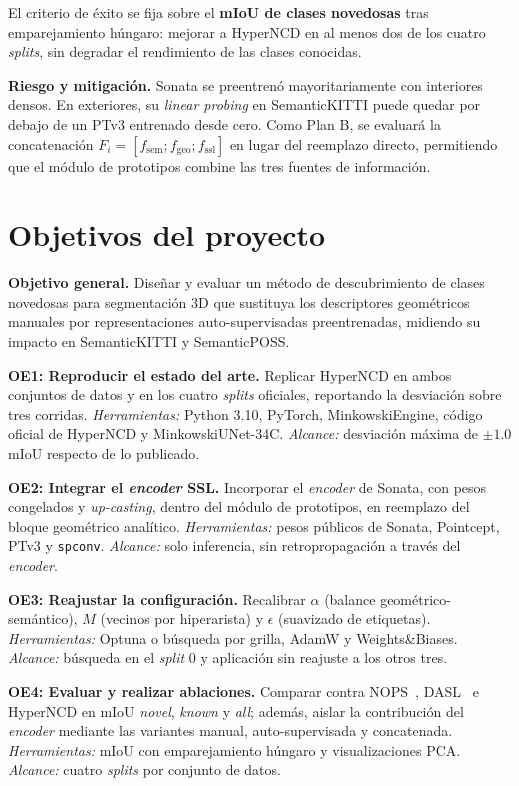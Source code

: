 \documentclass[9pt,twocolumn,a4paper]{extarticle}
\begin{document}
El criterio de éxito se fija sobre el \textbf{mIoU de clases novedosas} tras
emparejamiento húngaro: mejorar a HyperNCD en al menos dos de los cuatro
\emph{splits}, sin degradar el rendimiento de las clases conocidas.

\textbf{Riesgo y mitigación.}
Sonata se preentrenó mayoritariamente con interiores densos. En exteriores,
su \emph{linear probing} en SemanticKITTI puede quedar por debajo de un PTv3
entrenado desde cero. Como Plan B, se evaluará la concatenación
$F_i=[f_{\mathrm{sem}};f_{\mathrm{geo}};f_{\mathrm{ssl}}]$ en lugar del
reemplazo directo, permitiendo que el módulo de prototipos combine las tres
fuentes de información.

\section{Objetivos del proyecto}
\textbf{Objetivo general.}
Diseñar y evaluar un método de descubrimiento de clases novedosas para
segmentación 3D que sustituya los descriptores geométricos manuales por
representaciones auto-supervisadas preentrenadas, midiendo su impacto en
SemanticKITTI y SemanticPOSS.

\textbf{OE1: Reproducir el estado del arte.}
Replicar HyperNCD en ambos conjuntos de datos y en los cuatro \emph{splits}
oficiales, reportando la desviación sobre tres corridas.
\emph{Herramientas:} Python 3.10, PyTorch, MinkowskiEngine, código oficial de
HyperNCD y MinkowskiUNet-34C.
\emph{Alcance:} desviación máxima de $\pm1.0$ mIoU respecto de lo publicado.

\textbf{OE2: Integrar el \emph{encoder} SSL.}
Incorporar el \emph{encoder} de Sonata, con pesos congelados y
\emph{up-casting}, dentro del módulo de prototipos, en reemplazo del bloque
geométrico analítico.
\emph{Herramientas:} pesos públicos de Sonata, Pointcept, PTv3 y
\texttt{spconv}.
\emph{Alcance:} solo inferencia, sin retropropagación a través del
\emph{encoder}.

\textbf{OE3: Reajustar la configuración.}
Recalibrar $\alpha$ (balance geométrico-semántico), $M$ (vecinos por
hiperarista) y $\epsilon$ (suavizado de etiquetas).
\emph{Herramientas:} Optuna o búsqueda por grilla, AdamW y Weights\&Biases.
\emph{Alcance:} búsqueda en el \emph{split} 0 y aplicación sin reajuste a los
otros tres.

\textbf{OE4: Evaluar y realizar ablaciones.}
Comparar contra NOPS~\cite{nops}, DASL~\cite{dasl} e HyperNCD en mIoU
\emph{novel}, \emph{known} y \emph{all}; además, aislar la contribución del
\emph{encoder} mediante las variantes manual, auto-supervisada y concatenada.
\emph{Herramientas:} mIoU con emparejamiento húngaro y visualizaciones PCA.
\emph{Alcance:} cuatro \emph{splits} por conjunto de datos.
\end{document}
